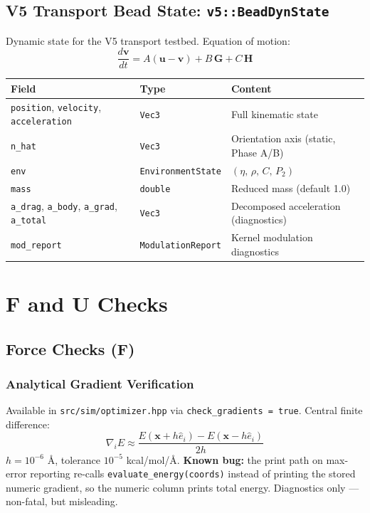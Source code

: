 \documentclass[11pt,a4paper]{article}
\begin{document}
\subsection{V5 Transport Bead State: \texttt{v5::BeadDynState}}

Dynamic state for the V5 transport testbed.
Equation of motion:
\[
\frac{d\mathbf{v}}{dt} = A(\mathbf{u} - \mathbf{v}) + B\,\mathbf{G} + C\,\mathbf{H}
\]

\begin{center}
\begin{tabular}{lll}
\toprule
Field & Type & Content \\
\midrule
\texttt{position}, \texttt{velocity}, \texttt{acceleration} & \texttt{Vec3} & Full kinematic state \\
\texttt{n\_hat} & \texttt{Vec3} & Orientation axis (static, Phase A/B) \\
\texttt{env} & \texttt{EnvironmentState} & $(\eta,\, \rho,\, C,\, P_2)$ \\
\texttt{mass} & \texttt{double} & Reduced mass (default 1.0) \\
\texttt{a\_drag}, \texttt{a\_body}, \texttt{a\_grad}, \texttt{a\_total} & \texttt{Vec3} & Decomposed acceleration (diagnostics) \\
\texttt{mod\_report} & \texttt{ModulationReport} & Kernel modulation diagnostics \\
\bottomrule
\end{tabular}
\end{center}

\section{F and U Checks}

\subsection{Force Checks (F)}

\subsubsection{Analytical Gradient Verification}
Available in \texttt{src/sim/optimizer.hpp} via \texttt{check\_gradients = true}.
Central finite difference:
\[
\nabla_i E \approx \frac{E(\mathbf{x} + h\hat{e}_i) - E(\mathbf{x} - h\hat{e}_i)}{2h}
\]
$h = 10^{-6}$ \AA, tolerance $10^{-5}$ kcal/mol/\AA.
\textbf{Known bug:} the print path on max-error reporting re-calls \texttt{evaluate\_energy(coords)} instead of printing the stored numeric gradient, so the numeric column prints total energy. Diagnostics only --- non-fatal, but misleading.
\end{document}
